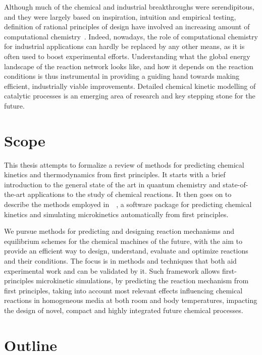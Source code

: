 Although much of the chemical and industrial breakthroughs were serendipitous,
and they were largely based on inspiration,
intuition and empirical testing,
definition of rational principles of design have involved an increasing amount of computational
chemistry~\cite{Kitchin_2012}.
Indeed,
nowadays,
the role of computational chemistry for industrial applications can
hardly be replaced by any other means,
as it is often used to boost experimental efforts.
Understanding what the global energy landscape of the reaction network looks like,
and how it depends on the reaction conditions is thus instrumental in providing a guiding hand towards making efficient,
industrially viable improvements.
Detailed chemical kinetic modelling of catalytic processes is an emerging area of research and key stepping stone for the future.

\section*{Scope}%
\label{sec:scope}

This thesis attempts to formalize a review of methods for predicting chemical
kinetics and thermodynamics from first principles.
It starts with a brief introduction to the general state of the art in quantum
chemistry and state-of-the-art applications to the study of chemical reactions.
It then goes on to describe the methods employed in~\overreact{}~\cite{Schneider_2022},
a software
package for predicting chemical kinetics and simulating microkinetics
automatically from first principles.

We pursue methods for predicting and designing reaction mechanisms
and equilibrium schemes for the chemical machines of the future,
with the aim to provide an efficient way to design,
understand,
evaluate and optimize reactions and their conditions.
The focus is in methods and techniques that both aid experimental work and can be validated by it.
Such framework allows first-principles microkinetic simulations,
by predicting the reaction mechanism from first principles,
taking into account most relevant effects influencing
chemical reactions in homogeneous media at both room and body temperatures,
impacting the design of novel,
compact and highly integrated future chemical processes.

\section*{Outline}%
\label{sec:outline}


